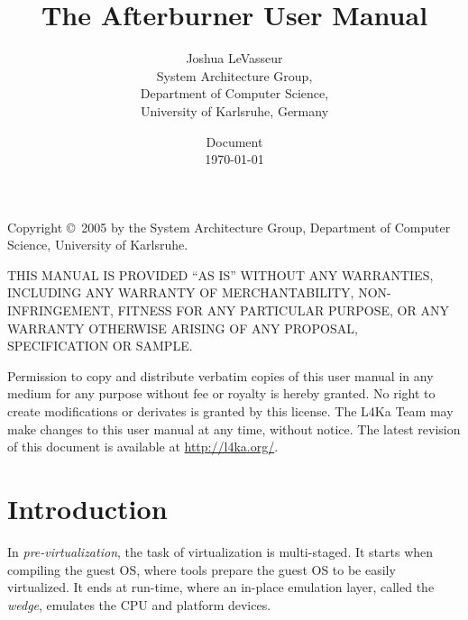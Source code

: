 \documentclass[twoside,a4paper]{report}
\title{\huge The Afterburner User Manual}
\author{Joshua LeVasseur\\
  System Architecture Group,\\
  Department of Computer Science,\\
  University of Karlsruhe, Germany
}
\date{Document \revision
  \\\today
}
\begin{document}
\pagestyle{empty}
\setcounter{page}{1}

\maketitle{}

\clearpage{}
\vspace*{\fill}
{\small

\noindent
Copyright \copyright\ 2005 by the System Architecture Group,
Department of Computer Science, University of Karlsruhe.

\vspace{1em}\noindent THIS MANUAL IS PROVIDED ``AS IS'' WITHOUT
ANY WARRANTIES, INCLUDING ANY WARRANTY OF MERCHANTABILITY,
NON-INFRINGEMENT, FITNESS FOR ANY PARTICULAR PURPOSE, OR ANY WARRANTY
OTHERWISE ARISING OF ANY PROPOSAL, SPECIFICATION OR SAMPLE.

\vspace{1em}\noindent Permission to copy and distribute verbatim
copies of this user manual in any medium for any purpose without fee
or royalty is hereby granted.  No right to create modifications or
derivates is granted by this license.  The L4Ka Team may make changes
to this user manual at any time, without notice.  The latest
revision of this document is available at \url{http://l4ka.org/}.

}


%
%

\pagestyle{headings}
\clearpage
\setcounter{page}{3}

\tableofcontents
\cleardoublepage

%
%

\raggedright
\setlength{\parskip}{1ex}

\chapter{Introduction}

In \emph{pre-virtualization}, the task of virtualization is multi-staged.  It
starts when compiling the guest OS, where tools prepare the guest OS
to be easily virtualized.  It ends at run-time, where an in-place
emulation layer, called the \emph{wedge}, emulates the CPU and platform
devices.
\end{document}
